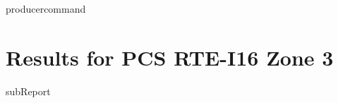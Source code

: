 {{ producercommand }}




    \section{Results for PCS RTE-I16 Zone 3}

    {{subReport}}
    \newpage

